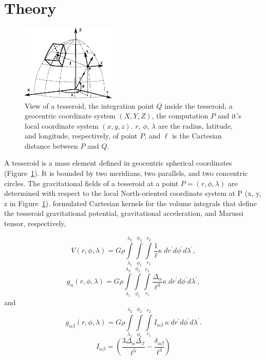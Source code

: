 \documentclass[paper,twocolumn,twoside]{geophysics}
\begin{document}
\section{Theory}


\begin{figure}
    \centering
    \includegraphics[width=0.4\textwidth]{figs/tesseroid}
    \caption{
        View of a tesseroid,
        the integration point $Q$ inside the tesseroid,
        a geocentric coordinate system $(X, Y, Z)$,
        the computation $P$ and it's local coordinate system $(x, y, z)$.
        $r$, $\phi$, $\lambda$ are
        the radius, latitude, and longitude, respectively, of point $P$,
        and $\ell$ is the Cartesian distance between $P$ and $Q$.
    }
    \label{fig:tesseroid}
\end{figure}

A tesseroid is a mass element defined in geocentric spherical
coordinates
(Figure~\ref{fig:tesseroid}).
It is bounded by two meridians, two parallels, and two concentric circles.
The gravitational fields of a tesseroid at a point $P = (r,\phi,\lambda)$
are determined with respect to the local North-oriented coordinate system at
P (x, y, z in Figure~\ref{fig:tesseroid}).
\citet{Grombein2013} formulated Cartesian kernels for the volume integrals
that define the tesseroid gravitational potential, gravitational acceleration,
and Marussi tensor, respectively,

\begin{equation}
    V(r,\phi,\lambda) = G \rho
        \int\limits_{\lambda_1}^{\lambda_2}
        \int\limits_{\phi_1}^{\phi_2}
        \int\limits_{r_1}^{r_2}
        \frac{1}{\ell}
        \kappa\  dr^\prime d\phi^\prime d\lambda^\prime,
    \label{eq:tesspot}
\end{equation}
\begin{equation}
    g_{\alpha}(r,\phi,\lambda) = G \rho
        \int\limits_{\lambda_1}^{\lambda_2}
        \int\limits_{\phi_1}^{\phi_2}
        \int\limits_{r_1}^{r_2}
        \frac{\Delta_\alpha}{\ell^3}
        \kappa\ dr^\prime d\phi^\prime d\lambda^\prime,
    \label{eq:tessgrav}
\end{equation}
\noindent
and
\begin{equation}
    g_{\alpha\beta}(r,\phi,\lambda) = G \rho
        \int\limits_{\lambda_1}^{\lambda_2}
        \int\limits_{\phi_1}^{\phi_2}
        \int\limits_{r_1}^{r_2}
        I_{\alpha\beta}
        \ \kappa\ dr^\prime d\phi^\prime d\lambda^\prime.
    \label{eq:tesstensor}
\end{equation}
\begin{equation}
    I_{\alpha\beta} =
    \left(
        \frac{3\Delta_{\alpha} \Delta_{\beta}}{\ell^5} -
        \frac{\delta_{\alpha\beta}}{\ell^3}
    \right)
    \label{eq:tesstensorkernel}
\end{equation}
\end{document}
